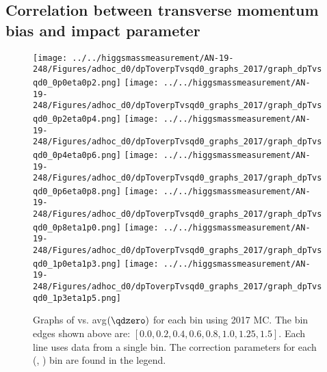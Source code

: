 \newpage
\subsection{Correlation between transverse momentum bias and impact parameter}
\label{app:dpT_graphs}

\begin{figure}[!htbp]
    \centering
    { \texttt{[image: ../../higgsmassmeasurement/AN-19-248/Figures/adhoc\_d0/dpToverpTvsqd0\_graphs\_2017/graph\_dpTvsqd0\_0p0eta0p2.png]}}
    { \texttt{[image: ../../higgsmassmeasurement/AN-19-248/Figures/adhoc\_d0/dpToverpTvsqd0\_graphs\_2017/graph\_dpTvsqd0\_0p2eta0p4.png]}}
    { \texttt{[image: ../../higgsmassmeasurement/AN-19-248/Figures/adhoc\_d0/dpToverpTvsqd0\_graphs\_2017/graph\_dpTvsqd0\_0p4eta0p6.png]}}
    { \texttt{[image: ../../higgsmassmeasurement/AN-19-248/Figures/adhoc\_d0/dpToverpTvsqd0\_graphs\_2017/graph\_dpTvsqd0\_0p6eta0p8.png]}}
    { \texttt{[image: ../../higgsmassmeasurement/AN-19-248/Figures/adhoc\_d0/dpToverpTvsqd0\_graphs\_2017/graph\_dpTvsqd0\_0p8eta1p0.png]}}
    { \texttt{[image: ../../higgsmassmeasurement/AN-19-248/Figures/adhoc\_d0/dpToverpTvsqd0\_graphs\_2017/graph\_dpTvsqd0\_1p0eta1p3.png]}}
    { \texttt{[image: ../../higgsmassmeasurement/AN-19-248/Figures/adhoc\_d0/dpToverpTvsqd0\_graphs\_2017/graph\_dpTvsqd0\_1p3eta1p5.png]}}
    \caption{ 
        Graphs of \pTmismeas vs. avg$(\qdzero)$ for each \abseta bin using 2017 MC.
        The \abseta bin edges shown above are: $[0.0, 0.2, 0.4, 0.6, 0.8, 1.0, 1.25, 1.5]$.
        Each line uses data from a single \pT bin. 
        The \pT correction parameters for each (\abseta, \pT) bin are found in the legend.
    }
\end{figure}
\newpage
